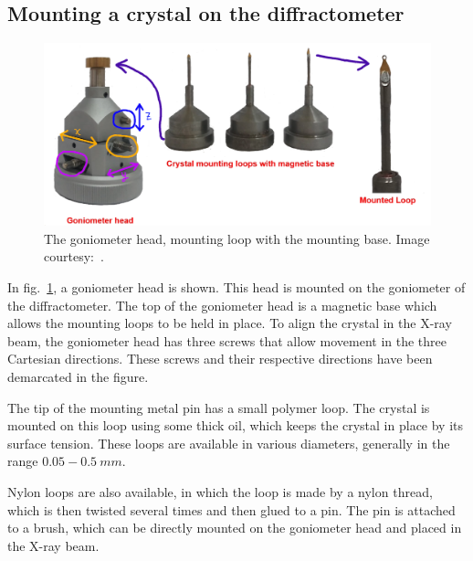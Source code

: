 \subsection{Mounting a crystal on the diffractometer}

	\begin{figure}[t]
		\includegraphics[scale=0.5]{goniometer1.png}
		\caption{\label{fig:goniometer}The goniometer head, mounting loop with the mounting base. Image courtesy:~\cite{Chowdhury2022}.}
	\end{figure}

	In fig.~\ref{fig:goniometer}, a goniometer head is shown. This head is mounted on the goniometer of the diffractometer. The top of the goniometer head is a magnetic base which allows the mounting loops to be held in place. To align the crystal in the X-ray beam, the goniometer head has three screws that allow movement in the three Cartesian directions. These screws and their respective directions have been demarcated in the figure.

		The tip of the mounting metal pin has a small polymer loop. The crystal is mounted on this loop using some thick oil, which keeps the crystal in place by its surface tension. These loops are available in various diameters, generally in the range $0.05-0.5~\si{mm}.$

		Nylon loops are also available, in which the loop is made by a nylon thread, which is then twisted several times and then glued to a pin. The pin is attached to a brush, which can be directly mounted on the goniometer head and placed in the X-ray beam.